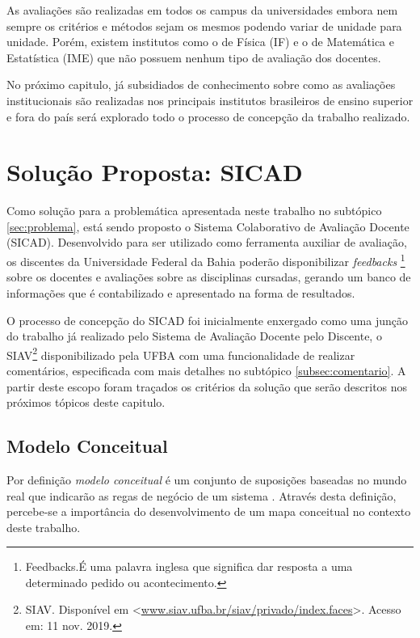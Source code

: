 \documentclass[12pt, a4paper]{report}
\begin{document}
As avaliações são realizadas em todos os campus da universidades embora nem sempre os critérios e métodos sejam os mesmos podendo variar de unidade para unidade. Porém, existem institutos como o de Física (IF) e o de Matemática e Estatística (IME) que não possuem nenhum tipo de avaliação dos docentes.

No próximo capitulo, já subsidiados de conhecimento sobre como as avaliações institucionais são realizadas nos principais institutos brasileiros de ensino superior e fora do país será explorado todo o processo de concepção da trabalho realizado.


\chapter{Solução Proposta: SICAD}
\label{chap:solucaoproposta}

Como solução para a problemática apresentada neste trabalho no subtópico \ref{sec:problema}, está sendo proposto o Sistema Colaborativo de Avaliação Docente (SICAD). Desenvolvido para ser utilizado como ferramenta auxiliar de avaliação, os discentes da Universidade Federal da Bahia poderão disponibilizar \textit{feedbacks} \footnote{Feedbacks.É uma palavra inglesa que significa dar resposta a uma determinado pedido ou acontecimento.} sobre os docentes e avaliações sobre as disciplinas cursadas, gerando um banco de informações que é contabilizado e apresentado na forma de resultados. 

O processo de concepção do SICAD foi inicialmente enxergado como uma junção do trabalho já realizado pelo Sistema de Avaliação Docente pelo Discente, o SIAV\footnote{SIAV. Disponível em <\url{www.siav.ufba.br/siav/privado/index.faces}>. Acesso em: 11 nov. 2019.} disponibilizado pela \ac{UFBA} com uma funcionalidade de realizar comentários, especificada com mais detalhes no subtópico \ref{subsec:comentario}. A partir deste escopo foram traçados os critérios da solução que serão descritos nos próximos tópicos deste capitulo.

\section{ Modelo Conceitual}
Por definição \textit{modelo conceitual} é um conjunto de suposições baseadas no mundo real que indicarão as regas de negócio de um sistema \citep{mapaconceitual}. Através desta definição, percebe-se a importância do desenvolvimento de um mapa conceitual no contexto deste trabalho.
\end{document}

